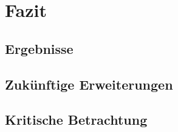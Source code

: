 \chapter{Fazit}
\section{Ergebnisse}
\section{Zukünftige Erweiterungen}
\section{Kritische Betrachtung}
